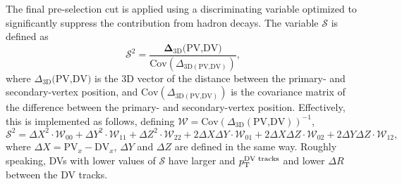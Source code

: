 The final pre-selection cut is applied using a discriminating variable optimized to significantly suppress the contribution from hadron decays. The variable $\mathcal{S}$ is defined as
\begin{equation}
    \mathcal{S}^{2} = \frac{\boldsymbol{\Delta}_{\text{3D}}\text{(PV,DV)}}{\text{Cov}(\Delta_{\text{3D}(\text{PV,DV})})},
\end{equation}
where $\Delta_{\text{3D}}\text{(PV,DV)}$ is the 3D vector of the distance between the primary- and secondary-vertex position, and $\text{Cov}(\Delta_{\text{3D}(\text{PV,DV})})$ is the covariance matrix of the difference between the primary- and secondary-vertex position. Effectively, this is implemented as follows, defining $\mathcal{W} = \text{Cov}(\Delta_{\text{3D}}(\text{PV,DV}))^{-1}$,
\begin{equation}
     \mathcal{S}^{2} = \Delta X^{2} \cdot \mathcal{W}_{00} + \Delta Y^{2} \cdot \mathcal{W}_{11} + \Delta Z^{2} \cdot \mathcal{W}_{22} + 2\Delta X \Delta Y \cdot\mathcal{W}_{01} + 2\Delta X \Delta Z \cdot\mathcal{W}_{02} + 2\Delta Y \Delta Z \cdot\mathcal{W}_{12},
 \end{equation}
where $\Delta X = \text{PV}_{x} - \text{DV}_{x}$, $\Delta Y$ and $\Delta Z$ are defined in the same way. Roughly speaking, DVs with lower values of $\mathcal{S}$ have larger \rdv and $p_\mathrm{T}^\text{DV tracks}$ and lower $\Delta R$ between the DV tracks.
 
